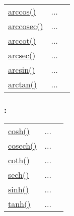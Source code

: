 \textcolor{blue}{}\begin{tabular}{>{\raggedleft}p{3cm}>{\centering}p{0.5cm}l}
\textcolor{blue}{\hyperlink{arccos}{arccos()}}&
...&
 \begin{NoHyper} \nameref{par:Arc-cosine} \end{NoHyper}\tabularnewline
\textcolor{blue}{\hyperlink{arccosec}{arccosec()}}&
...&
 \begin{NoHyper} \nameref{par:Arc-cosec} \end{NoHyper}\tabularnewline
\textcolor{blue}{\hyperlink{arccot}{arccot()}}&
...&
 \begin{NoHyper} \nameref{par:Arc-cotangent} \end{NoHyper}\tabularnewline
\textcolor{blue}{\hyperlink{arcsec}{arcsec()}}&
...&
 \begin{NoHyper} \nameref{par:Arc-sec} \end{NoHyper}\tabularnewline
\textcolor{blue}{\hyperlink{arcsin}{arcsin()}}&
...&
 \begin{NoHyper} \nameref{par:Arc-sine} \end{NoHyper}\tabularnewline
\textcolor{blue}{\hyperlink{arctan}{arctan()}}&
...&
 \begin{NoHyper} \nameref{par:Arc-tangent} \end{NoHyper}\tabularnewline
\end{tabular}


\subsubsection*{: }

\textcolor{blue}{}\begin{tabular}{>{\raggedleft}p{3cm}>{\centering}p{0.5cm}l}
\textcolor{blue}{\hyperlink{cosh}{cosh()}}&
...&
 \begin{NoHyper} \nameref{par:Hyperbolic-cosine} \end{NoHyper}\tabularnewline
\textcolor{blue}{\hyperlink{cosech}{cosech()}}&
...&
 \begin{NoHyper} \nameref{par:Hyperbolic-cosecant} \end{NoHyper}\tabularnewline
\textcolor{blue}{\hyperlink{coth}{coth()}}&
...&
 \begin{NoHyper} \nameref{par:Hyperbolic-cotangent} \end{NoHyper}\tabularnewline
\textcolor{blue}{\hyperlink{sech}{sech()}}&
...&
 \begin{NoHyper} \nameref{par:Hyperbolic-secant} \end{NoHyper}\tabularnewline
\textcolor{blue}{\hyperlink{sinh}{sinh()}}&
...&
 \begin{NoHyper} \nameref{par:Hyperbolic-sine} \end{NoHyper}\tabularnewline
\textcolor{blue}{\hyperlink{tanh}{tanh()}}&
...&
 \begin{NoHyper} \nameref{par:Hyperbolic-tangent} \end{NoHyper}\tabularnewline
\end{tabular}


